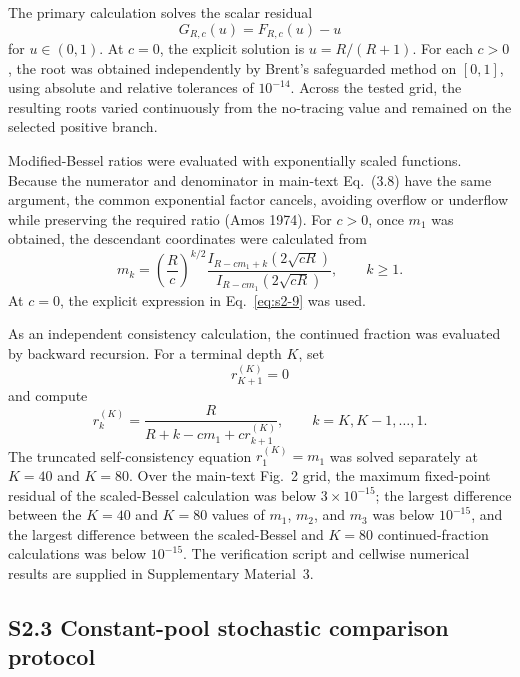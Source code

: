 \documentclass[11pt]{article}
\begin{document}
The primary calculation solves the scalar residual
\begin{equation}
G_{R,c}(u)=F_{R,c}(u)-u
\end{equation}
for $u\in(0,1)$. At $c=0$, the explicit solution is $u=R/(R+1)$. For each $c>0$, the root was obtained independently by Brent's safeguarded method on $[0,1]$, using absolute and relative tolerances of $10^{-14}$. Across the tested grid, the resulting roots varied continuously from the no-tracing value and remained on the selected positive branch.

Modified-Bessel ratios were evaluated with exponentially scaled functions. Because the numerator and denominator in main-text Eq.~(3.8) have the same argument, the common exponential factor cancels, avoiding overflow or underflow while preserving the required ratio (Amos 1974). For $c>0$, once $m_1$ was obtained, the descendant coordinates were calculated from
\begin{equation}
m_k=\left(\frac{R}{c}\right)^{k/2}\frac{I_{R-cm_1+k}\!\left(2\sqrt{cR}\right)}{I_{R-cm_1}\!\left(2\sqrt{cR}\right)},
\qquad k\geq1.
\end{equation}
At $c=0$, the explicit expression in Eq.~\eqref{eq:s2-9} was used.

As an independent consistency calculation, the continued fraction was evaluated by backward recursion. For a terminal depth $K$, set
\begin{equation}
r_{K+1}^{(K)}=0
\end{equation}
and compute
\begin{equation}
r_k^{(K)}=\frac{R}{R+k-cm_1+cr_{k+1}^{(K)}},
\qquad k=K,K-1,\ldots,1.
\end{equation}
The truncated self-consistency equation $r_1^{(K)}=m_1$ was solved separately at $K=40$ and $K=80$. Over the main-text Fig.~2 grid, the maximum fixed-point residual of the scaled-Bessel calculation was below $3\times10^{-15}$; the largest difference between the $K=40$ and $K=80$ values of $m_1$, $m_2$, and $m_3$ was below $10^{-15}$, and the largest difference between the scaled-Bessel and $K=80$ continued-fraction calculations was below $10^{-15}$. The verification script and cellwise numerical results are supplied in Supplementary Material~3.

\subsection*{S2.3 Constant-pool stochastic comparison protocol}
\end{document}
